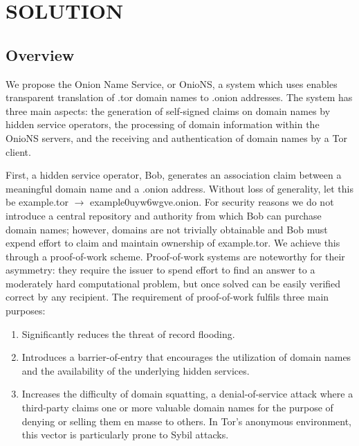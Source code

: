 
\chapter{SOLUTION}
\label{chapter:Solution}



\section{Overview}

We propose the Onion Name Service, or OnioNS, a system which uses enables transparent translation of .tor domain names to .onion addresses. The system has three main aspects: the generation of self-signed claims on domain names by hidden service operators, the processing of domain information within the OnioNS servers, and the receiving and authentication of domain names by a Tor client.

First, a hidden service operator, Bob, generates an association claim between a meaningful domain name and a .onion address. Without loss of generality, let this be example.tor $ \rightarrow $ example0uyw6wgve.onion. For security reasons we do not introduce a central repository and authority from which Bob can purchase domain names; however, domains are not trivially obtainable and Bob must expend effort to claim and maintain ownership of example.tor. We achieve this through a proof-of-work scheme. Proof-of-work systems are noteworthy for their asymmetry: they require the issuer to spend effort to find an answer to a moderately hard computational problem, but once solved can be easily verified correct by any recipient. The requirement of proof-of-work fulfils three main purposes:

\begin{enumerate}
	\item Significantly reduces the threat of record flooding.
	\item Introduces a barrier-of-entry that encourages the utilization of domain names and the availability of the underlying hidden services.
	\item Increases the difficulty of domain squatting, a denial-of-service attack where a third-party claims one or more valuable domain names for the purpose of denying or selling them en masse to others. In Tor's anonymous environment, this vector is particularly prone to Sybil attacks.
\end{enumerate}

